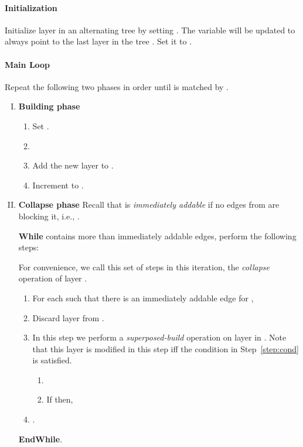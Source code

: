 \documentclass[11pt]{article}
\theoremstyle{definition}
\theoremstyle{remark}
\begin{document}
\paragraph{Initialization} Initialize layer  in an alternating
tree  by setting . The
variable  will be updated to always point to the last layer in
the tree . Set it to .

\paragraph{Main Loop} Repeat the following two phases in order until
 is matched by .

\begin{enumerate}[(I)]
\item \textbf{Building phase}

  \begin{enumerate}
  \item Set .
  \item 
  \item Add the new layer  to
    .
  \item Increment  to .
  \end{enumerate}

\item \textbf{Collapse phase} Recall that  is
  \textit{immediately addable} if no edges from  are blocking it,
  i.e., .

    \textbf{While}  contains more than 
    immediately addable edges, perform the following steps:

    For convenience, we call this set of steps in this iteration, the
    \emph{collapse} operation of layer .

    \begin{enumerate}
    \item\label{step:lazy1} For each  such that there is an immediately
      addable edge  for ,
      
    \item Discard layer  from .
    \item\label{step:simulate} In this step we perform a
      \emph{superposed-build} operation on layer
       in . Note that this
      layer is modified in this step iff the condition in
      Step~\ref{step:cond} is satisfied.
      \begin{enumerate}
      \item
        
      \item\label{step:cond} If
         then,
        
      \end{enumerate}
    \item .
    \end{enumerate}
    \textbf{EndWhile}.
\end{enumerate}
\end{document}
